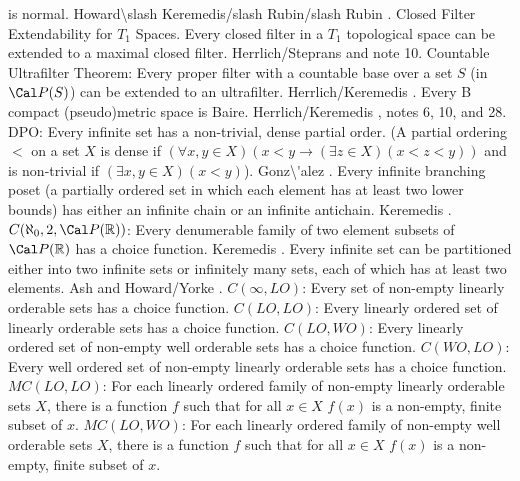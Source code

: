 is normal. \ac{Howard\slash Keremedis/slash Rubin/slash Rubin} \cite{1998b}.
\medskip
\medskip
{} Closed Filter Extendability for $T_1$ Spaces.
Every closed filter in a $T_1$ topological space can be extended to a
maximal closed filter. \ac{Herrlich/Steprans} \cite{1997} and note 10.
\medskip
{} Countable Ultrafilter Theorem:  Every proper
filter with a countable base over a set $S$ (in ${\Cal P}(S)$) can
be extended to an ultrafilter. \ac{Herrlich/Keremedis} \cite{1999a}.
\medskip
{} Every B compact (pseudo)metric space is Baire.
\ac{Herrlich/Keremedis} \cite{1999a}, notes 6, 10, and 28.
\medskip
{} DPO:  Every infinite set has a non-trivial,
dense partial order.  (A partial ordering $<$ on a set $X$ is dense
if $(\forall x, y\in X)(x<y \to (\exists z\in X)(x<z<y))$ and is
non-trivial if $(\exists x,y\in X)(x < y)$).  \ac{Gonz\'alez}
\cite{1995a}.
\medskip
{} Every infinite branching poset (a partially
ordered set in which each element has at least two lower bounds) has
either an infinite chain or an infinite antichain. \ac{Keremedis}
\cite{1999a}.
\medskip
{} $C(\aleph_0,2,\Cal P({\Bbb R}))$: Every
denumerable family of two element subsets of $\Cal P({\Bbb R})$ has
a choice function.  \ac{Keremedis} \cite{1999b}.
\medskip
{} Every infinite set can be partitioned either
into two infinite sets or infinitely many sets, each of which has at
least two elements. \ac{Ash} \cite{1983} and \ac{Howard/Yorke}
\cite{1989}.
\medskip
{} $C(\infty,LO)$: Every set of non-empty
linearly orderable sets has a choice function.
\medskip
{} $C(LO,LO)$: Every linearly ordered set of
linearly orderable sets has a choice function.
\medskip
{} $C(LO,WO)$: Every linearly ordered set of
non-empty well orderable sets has a choice function.
\medskip
{} $C(WO,LO)$: Every well ordered set of
non-empty linearly orderable sets has a choice function.
\medskip
{} $MC(LO,LO)$: For each linearly ordered family
of non-empty linearly orderable sets $X$, there is a function $f$ such
that for all $x\in X$ $f(x)$ is a non-empty, finite subset of $x$.
\medskip
{} $MC(LO,WO)$: For each linearly ordered family
of non-empty well orderable sets $X$, there is a function $f$ such
that for all $x\in X$ $f(x)$ is a non-empty, finite subset of $x$.
